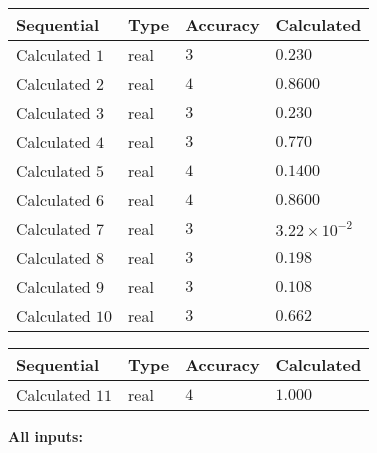 \documentclass[12pt]{article}
\begin{document}
  
\noindent\begin{tabular}{|l|l|l|l|}
\hline
 Sequential & Type & Accuracy & Calculated \\ 
\hline
 
 
  Calculated $            1 $ & real & $            3  $ & 
 $ 0.230 $ 
 \\  \hline  
 
 
  Calculated $            2 $ & real & $            4  $ & 
 $ 0.8600 $ 
 \\  \hline  
 
 
  Calculated $            3 $ & real & $            3  $ & 
 $ 0.230 $ 
 \\  \hline  
 
 
  Calculated $            4 $ & real & $            3  $ & 
 $ 0.770 $ 
 \\  \hline  
 
 
  Calculated $            5 $ & real & $            4  $ & 
 $ 0.1400 $ 
 \\  \hline  
 
 
  Calculated $            6 $ & real & $            4  $ & 
 $ 0.8600 $ 
 \\  \hline  
 
 
  Calculated $            7 $ & real & $            3  $ & 
 $ 3.22 \times 10^{-2} $ 
 \\  \hline  
 
 
  Calculated $            8 $ & real & $            3  $ & 
 $ 0.198 $ 
 \\  \hline  
 
 
  Calculated $            9 $ & real & $            3  $ & 
 $ 0.108 $ 
 \\  \hline  
 
 
  Calculated $           10 $ & real & $            3  $ & 
 $ 0.662 $ 
 \\  \hline  
 \end{tabular}
   
   
  
  
\noindent\begin{tabular}{|l|l|l|l|}
\hline
 Sequential & Type & Accuracy & Calculated \\ 
\hline
 
 
  Calculated $           11 $ & real & $            4  $ & 
 $ 1.000 $ 
 \\  \hline  
 \end{tabular}
   
   
   
   
\noindent\vspace{0.1in}\hspace{-0.08in} {\textbf{\Large{All inputs: }}}
   
\end{document}
